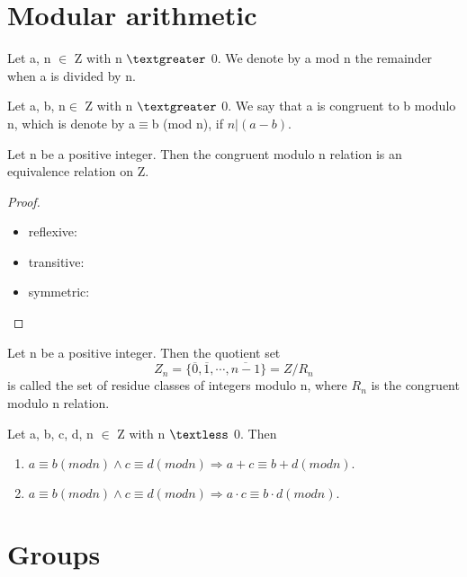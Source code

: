 \documentclass[cn,10pt,math=newtx,citestyle=gb7714-2015,bibstyle=gb7714-2015]{elegantbook}
\begin{document}
\section{Modular arithmetic}
\begin{definition}
    Let a, n $\in$ Z with n  $\textgreater$ 0. We denote
by a mod n the remainder when a is divided by n.
\end{definition}

\begin{definition}
    Let a, b, n$\in$ Z with n $\textgreater$ 0. We say
that a is congruent to b modulo n, which is denote by a$\equiv$b (mod n), if $n | (a-b)$.
\end{definition}

\begin{theorem}
    Let n be a positive integer. Then the
congruent modulo n relation is an equivalence
relation on Z.
\end{theorem}
\begin{proof}
    \begin{itemize}
        \item reflexive:
        \item  transitive:
        \item symmetric:
    \end{itemize}
\end{proof}

\begin{definition}
    Let n be a positive integer. Then the quotient set
    \begin{equation*}
        Z_n=\{\overline{0},\overline{1},\cdots,\overline{n-1}\}=Z/R_n
    \end{equation*}
    is called the set of residue classes of integers modulo n,
where $R_n$ is the congruent modulo n relation.
\end{definition}
\begin{theorem}
    Let a, b, c, d, n $\in$ Z with n $\textless$ 0. Then
    \begin{enumerate}
        \item $a \equiv  b ( mod n)  \land  c \equiv  d ( mod n) \Rightarrow a + c \equiv  b + d ( mod n) .$
        \item $a \equiv  b ( mod n)  \land  c \equiv  d ( mod n) \Rightarrow a \cdotp  c \equiv  b \cdot  d ( mod n) .$
    \end{enumerate}
\end{theorem}

\section{Groups}
\end{document}
